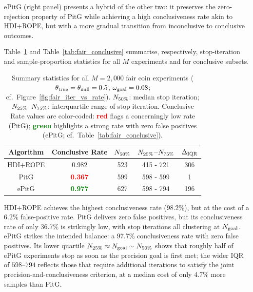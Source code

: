 ePitG (right panel) presents a hybrid of the other two: it preserves the zero-rejection
property of PitG while achieving a high conclusiveness rate akin to HDI+ROPE, but with
a more gradual transition from inconclusive to conclusive outcomes.

Table~\ref{tab:fair_overall} and Table~\ref{tab:fair_conclusive} summarise, respectively,
stop-iteration and sample-proportion statistics for all $M$ experiments and for conclusive subsets.

\begin{table}[h!]
  \begin{center}
  \begin{tabular}{c|c|c|c|c}
    \hline
    Algorithm &  Conclusive Rate  & $N_{\rm 50\%}$ & $N_{\rm 25\%}$--$N_{\rm 75\%}$ & $\Delta_{\rm IQR}$\\
    \hline
    HDI+ROPE & 0.982 & 523 & 415 - 721& 306  \\
    PitG     & \textcolor{red}{\textbf{0.367}}  & 599 & 598 - 599& 1 \\
    ePitG    & \textcolor{green}{\textbf{0.977}}  & 627 & 598 - 794& 196 \\
    \hline
  \end{tabular}
  \caption{Summary statistics for all $M=2{,}000$ fair coin experiments
  ($\theta_{\rm true}=\theta_{\rm null}=0.5$, $\omega_{\rm goal}=0.08$;
  cf.\ Figure~\ref{fig:fair_iter_vs_rate}).
  $N_{\rm 50\%}$: median stop iteration;
  $N_{\rm 25\%}$--$N_{\rm 75\%}$: interquartile range of stop iteration.
  Conclusive Rate values are color-coded: \textcolor{red}{\textbf{red}} flags a
  concerningly low rate (PitG); \textcolor{green}{\textbf{green}} highlights a
  strong rate with zero false positives (ePitG; cf.\ Table~\ref{tab:fair_conclusive}).}
  \label{tab:fair_overall}
\end{center}
\end{table}

HDI+ROPE achieves the highest conclusiveness rate (98.2\%), but at the cost of a 6.2\%
false-positive rate. PitG delivers zero false positives, but its conclusiveness rate of
only 36.7\% is strikingly low, with stop iterations all clustering at $N_{\rm goal}$.
ePitG strikes the intended balance: a 97.7\% conclusiveness rate with zero false
positives. Its lower quartile $N_{\rm 25\%}\approx N_{\rm goal} \sim N_{\rm 50\%}$ shows that roughly half
of ePitG experiments stop as soon as the precision goal is first met; the wider IQR of
$598$--$794$ reflects those that require additional iterations to satisfy the joint
precision-and-conclusiveness criterion, at a median cost of only 4.7\% more samples than
PitG.



